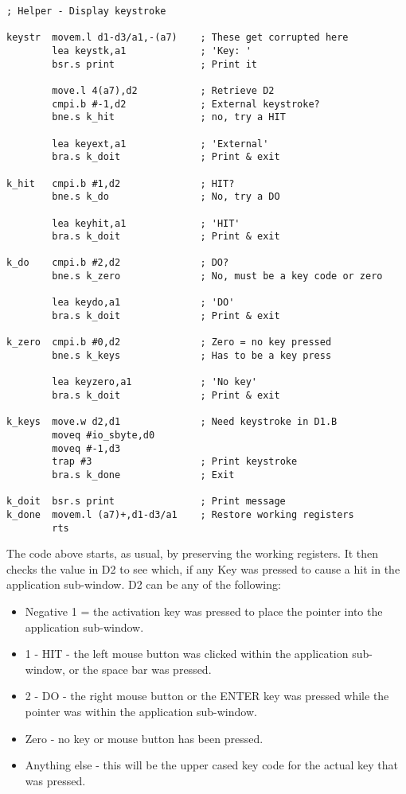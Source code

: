 \begin{lstlisting}[firstnumber=1,]
; Helper - Display keystroke

keystr  movem.l d1-d3/a1,-(a7)    ; These get corrupted here
        lea keystk,a1             ; 'Key: '
        bsr.s print               ; Print it

        move.l 4(a7),d2           ; Retrieve D2
        cmpi.b #-1,d2             ; External keystroke?
        bne.s k_hit               ; no, try a HIT

        lea keyext,a1             ; 'External'
        bra.s k_doit              ; Print & exit

k_hit   cmpi.b #1,d2              ; HIT?
        bne.s k_do                ; No, try a DO

        lea keyhit,a1             ; 'HIT'
        bra.s k_doit              ; Print & exit

k_do    cmpi.b #2,d2              ; DO?
        bne.s k_zero              ; No, must be a key code or zero

        lea keydo,a1              ; 'DO'
        bra.s k_doit              ; Print & exit

k_zero  cmpi.b #0,d2              ; Zero = no key pressed
        bne.s k_keys              ; Has to be a key press

        lea keyzero,a1            ; 'No key'
        bra.s k_doit              ; Print & exit

k_keys  move.w d2,d1              ; Need keystroke in D1.B
        moveq #io_sbyte,d0
        moveq #-1,d3
        trap #3                   ; Print keystroke
        bra.s k_done              ; Exit

k_doit  bsr.s print               ; Print message
k_done  movem.l (a7)+,d1-d3/a1    ; Restore working registers
        rts
\end{lstlisting}

The code above starts, as usual, by preserving the working registers. It
        then checks the value in D2 to see which, if any Key was pressed to cause a hit in
        the application sub-{}window. D2 can be any of the following:
\begin{itemize}

\item{}Negative 1 = the activation key was pressed to place the pointer
                into the application sub-{}window.


\item{}1 -{} HIT -{} the left mouse button was clicked within the application
                sub-{}window, or the space bar was pressed.


\item{}2 -{} DO -{} the right mouse button or the ENTER key was pressed while
                the pointer was within the application sub-{}window.


\item{}Zero -{} no key or mouse button has been pressed.


\item{}Anything else -{} this will be the upper cased key code for the actual
                key that was pressed.

\end{itemize}

